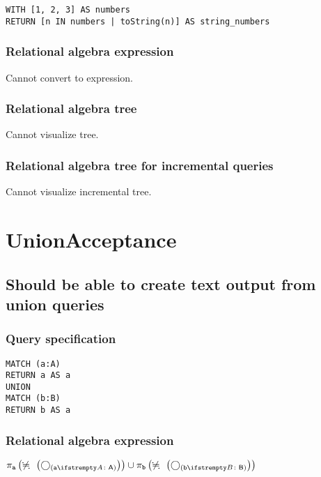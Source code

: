 \begin{lstlisting}
WITH [1, 2, 3] AS numbers
RETURN [n IN numbers | toString(n)] AS string_numbers
\end{lstlisting}

\subsubsection*{Relational algebra expression}

Cannot convert to expression.

\subsubsection*{Relational algebra tree}

Cannot visualize tree.

\subsubsection*{Relational algebra tree for incremental queries}

Cannot visualize incremental tree.

\section{UnionAcceptance}

\subsection{Should be able to create text output from union queries}

\subsubsection*{Query specification}

\begin{lstlisting}
MATCH (a:A)
RETURN a AS a
UNION
MATCH (b:B)
RETURN b AS a
\end{lstlisting}

\subsubsection*{Relational algebra expression}

$\projection{\var{a}} \left(\alldifferent{} \left(\getvertices{a}{A}\right)\right) \union \projection{\var{b}} \left(\alldifferent{} \left(\getvertices{b}{B}\right)\right)$

